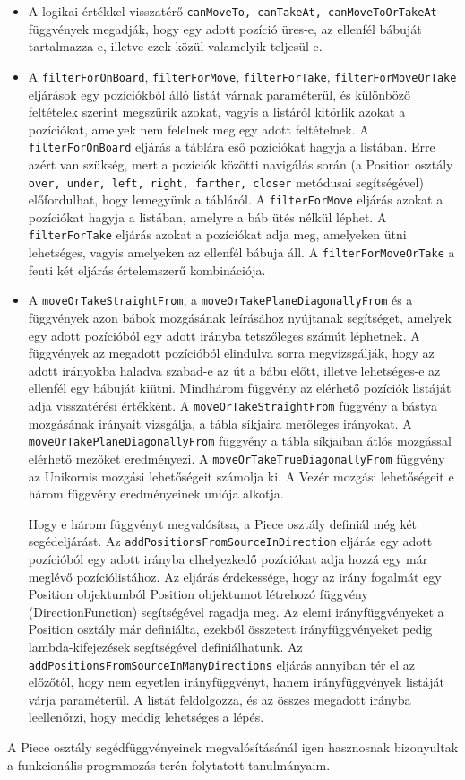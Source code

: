 \documentclass[12pt, twoside]{report}
\begin{document}
\begin{itemize}
	\item A logikai értékkel visszatérő {\tt canMoveTo, canTakeAt, canMoveToOrTakeAt} függvények megadják, hogy egy adott pozíció üres-e, az ellenfél bábuját tartalmazza-e, illetve ezek közül valamelyik teljesül-e.
	\item A {\tt filterForOnBoard}, {\tt filterForMove}, {\tt filterForTake}, {\tt filterForMoveOrTake} eljárások egy pozíciókból álló listát várnak paraméterül, és különböző feltételek szerint megszűrik azokat, vagyis a listáról kitörlik azokat a pozíciókat, amelyek nem felelnek meg egy adott feltételnek. 
		\subitem A {\tt filterForOnBoard} eljárás a táblára eső pozíciókat hagyja a listában. Erre azért van szükség, mert a pozíciók közötti navigálás során (a Position osztály {\tt over, under, left, right, farther, closer} metódusai segítségével) előfordulhat, hogy lemegyünk a tábláról. 
		\subitem A {\tt filterForMove} eljárás azokat a pozíciókat hagyja a listában, amelyre a báb ütés nélkül léphet.
		\subitem A {\tt filterForTake} eljárás azokat a pozíciókat adja meg, amelyeken ütni lehetséges, vagyis amelyeken az ellenfél bábuja áll.
		\subitem A {\tt filterForMoveOrTake} a fenti két eljárás értelemszerű kombinációja.
	\item A {\tt moveOrTakeStraightFrom}, a {\tt moveOrTakePlaneDiagonallyFrom} és a  függvények azon bábok mozgásának leírásához nyújtanak segítséget, amelyek egy adott pozícióból egy adott irányba tetszőleges számút léphetnek. A függvények az megadott pozícióból elindulva sorra megvizsgálják, hogy az adott irányokba haladva szabad-e az út a bábu előtt, illetve lehetséges-e az ellenfél egy bábuját kiütni. Mindhárom függvény az elérhető pozíciók listáját adja visszatérési értékként. A {\tt moveOrTakeStraightFrom} függvény a bástya mozgásának irányait vizsgálja, a tábla síkjaira merőleges irányokat. A {\tt moveOrTakePlaneDiagonallyFrom} függvény a tábla síkjaiban átlós mozgással elérhető mezőket eredményezi. A {\tt moveOrTakeTrueDiagonallyFrom} függvény az Unikornis mozgási lehetőségeit számolja ki. A Vezér mozgási lehetőségeit e három függvény eredményeinek uniója alkotja.
	
	Hogy e három függvényt megvalósítsa, a Piece osztály definiál még két segédeljárást.
	\subitem Az {\tt addPositionsFromSourceInDirection} eljárás egy adott pozícióból egy adott irányba elhelyezkedő pozíciókat adja hozzá egy már meglévő pozíciólistához. Az eljárás érdekessége, hogy az irány fogalmát egy Position objektumból Position objektumot létrehozó függvény (DirectionFunction) segítségével ragadja meg. Az elemi irányfüggvényeket a Position osztály már definiálta, ezekből összetett irányfüggvényeket pedig lambda-kifejezések segítségével definiálhatunk.
	\subitem Az {\tt addPositionsFromSourceInManyDirections} eljárás annyiban tér el az előzőtől, hogy nem egyetlen irányfüggvényt, hanem irányfüggvények listáját várja paraméterül. A listát feldolgozza, és az összes megadott irányba leellenőrzi, hogy meddig lehetséges a lépés.
\end{itemize}
A Piece osztály segédfüggvényeinek megvalósításánál igen hasznosnak bizonyultak a funkcionális programozás terén folytatott tanulmányaim.
\end{document}
